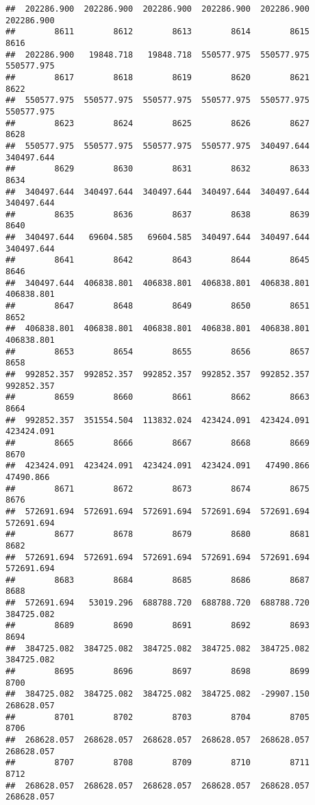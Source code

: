 \documentclass[
]{book}
\begin{document}
\begin{verbatim}
##  202286.900  202286.900  202286.900  202286.900  202286.900  202286.900 
##        8611        8612        8613        8614        8615        8616 
##  202286.900   19848.718   19848.718  550577.975  550577.975  550577.975 
##        8617        8618        8619        8620        8621        8622 
##  550577.975  550577.975  550577.975  550577.975  550577.975  550577.975 
##        8623        8624        8625        8626        8627        8628 
##  550577.975  550577.975  550577.975  550577.975  340497.644  340497.644 
##        8629        8630        8631        8632        8633        8634 
##  340497.644  340497.644  340497.644  340497.644  340497.644  340497.644 
##        8635        8636        8637        8638        8639        8640 
##  340497.644   69604.585   69604.585  340497.644  340497.644  340497.644 
##        8641        8642        8643        8644        8645        8646 
##  340497.644  406838.801  406838.801  406838.801  406838.801  406838.801 
##        8647        8648        8649        8650        8651        8652 
##  406838.801  406838.801  406838.801  406838.801  406838.801  406838.801 
##        8653        8654        8655        8656        8657        8658 
##  992852.357  992852.357  992852.357  992852.357  992852.357  992852.357 
##        8659        8660        8661        8662        8663        8664 
##  992852.357  351554.504  113832.024  423424.091  423424.091  423424.091 
##        8665        8666        8667        8668        8669        8670 
##  423424.091  423424.091  423424.091  423424.091   47490.866   47490.866 
##        8671        8672        8673        8674        8675        8676 
##  572691.694  572691.694  572691.694  572691.694  572691.694  572691.694 
##        8677        8678        8679        8680        8681        8682 
##  572691.694  572691.694  572691.694  572691.694  572691.694  572691.694 
##        8683        8684        8685        8686        8687        8688 
##  572691.694   53019.296  688788.720  688788.720  688788.720  384725.082 
##        8689        8690        8691        8692        8693        8694 
##  384725.082  384725.082  384725.082  384725.082  384725.082  384725.082 
##        8695        8696        8697        8698        8699        8700 
##  384725.082  384725.082  384725.082  384725.082  -29907.150  268628.057 
##        8701        8702        8703        8704        8705        8706 
##  268628.057  268628.057  268628.057  268628.057  268628.057  268628.057 
##        8707        8708        8709        8710        8711        8712 
##  268628.057  268628.057  268628.057  268628.057  268628.057  268628.057 

\end{verbatim}
\end{document}
